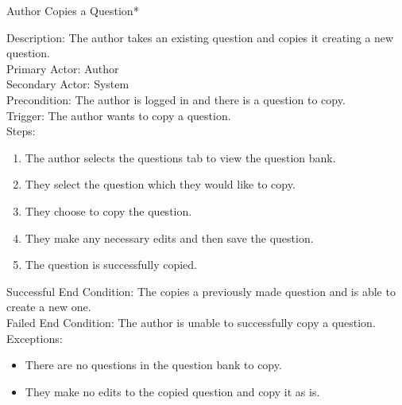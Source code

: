     
    \begin{section}{Author Copies a Question*} 
  
Description: The author takes an existing question and copies it creating a new question.\\
Primary Actor: Author\\
Secondary Actor: System\\
Precondition: The author is logged in and there is a question to copy.\\
Trigger: The author wants to copy a question.\\
Steps:
\begin{enumerate}
\item The author selects the questions tab to view the question bank.
\item They select the question which they would like to copy.
\item They choose to copy the question.
\item They make any necessary edits and then save the question.
\item The question is successfully copied.
\end{enumerate}
Successful End Condition: The copies a previously made question and is able to create a new one.\\
Failed End Condition: The author is unable to successfully copy a question.
Exceptions: 
\begin{itemize}
\item There are no questions in the question bank to copy.
\item They make no edits to the copied question and copy it as is.

\end{itemize}


    \end{section}

